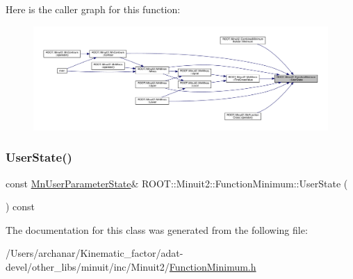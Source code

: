 Here is the caller graph for this function\+:
\nopagebreak
\begin{figure}[H]
\begin{center}
\leavevmode
\includegraphics[width=350pt]{d4/dfb/classROOT_1_1Minuit2_1_1FunctionMinimum_a698dc320ec24e2288f391f160ef8213e_icgraph}
\end{center}
\end{figure}
\mbox{\label{classROOT_1_1Minuit2_1_1FunctionMinimum_a698dc320ec24e2288f391f160ef8213e}} 
\subsubsection{\texorpdfstring{UserState()}{UserState()}\hspace{0.1cm}{\footnotesize\ttfamily [3/3]}}
{\footnotesize\ttfamily const \mbox{\hyperlink{classROOT_1_1Minuit2_1_1MnUserParameterState}{Mn\+User\+Parameter\+State}}\& R\+O\+O\+T\+::\+Minuit2\+::\+Function\+Minimum\+::\+User\+State (\begin{DoxyParamCaption}{ }\end{DoxyParamCaption}) const\hspace{0.3cm}{\ttfamily [inline]}}



The documentation for this class was generated from the following file\+:\begin{DoxyCompactItemize}
\item 
/\+Users/archanar/\+Kinematic\+\_\+factor/adat-\/devel/other\+\_\+libs/minuit/inc/\+Minuit2/\mbox{\hyperlink{adat-devel_2other__libs_2minuit_2inc_2Minuit2_2FunctionMinimum_8h}{Function\+Minimum.\+h}}\end{DoxyCompactItemize}
